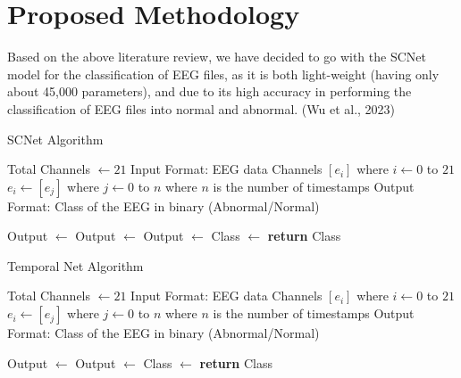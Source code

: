 \documentclass[11pt]{article}
\begin{document}
\section{Proposed Methodology}
Based on the above literature review, we have decided to go with the SCNet model for the classification of EEG files, as it is both light-weight (having only about 45,000 parameters), and due to its high accuracy in performing the classification of EEG files into normal and abnormal. (Wu et al., 2023)

\begin{algorithm}
\caption{SCNet Algorithm}
    \begin{algorithmic}[1]
     
        \State Total Channels $\gets 21$
        \State Input Format: EEG data Channels $[e_i]$ where $i \gets 0$ to $21$
        \State $e_i \gets [e_j]$ where $j \gets 0$ to $n$ where $n$ is the number of timestamps
        \State 
        \State Output Format: Class of the EEG in binary (Abnormal/Normal)
        \State

        \State Output $\gets$  
        \State Output $\gets$ 
        \State Output $\gets$ 
        \State Class $\gets$ 
        \State \textbf{return} Class
    \EndProcedure
    \end{algorithmic}
\end{algorithm}

\begin{algorithm}
\caption{Temporal Net Algorithm}
    \begin{algorithmic}[1]
     
        \State Total Channels $\gets 21$
        \State Input Format: EEG data Channels $[e_i]$ where $i \gets 0$ to $21$
        \State $e_i \gets [e_j]$ where $j \gets 0$ to $n$ where $n$ is the number of timestamps
        \State 
        \State Output Format: Class of the EEG in binary (Abnormal/Normal)
        \State

        \State Output $\gets$  
        \State Output $\gets$ 
        \State Class $\gets$ 
        \State \textbf{return} Class
    \EndProcedure
    \end{algorithmic}
    
\end{algorithm}
\end{document}
